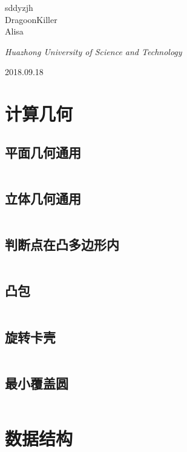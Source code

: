 \documentclass[UTF8]{ctexart}
\begin{document}
\begin{titlepage}
	{\protect sddyzjh \\ DragoonKiller \\ Alisa \\} %
	
	\vspace{0.5\baselineskip} %
	
	\textit{Huazhong University of Science and Technology} %
	
	\vfill %
	
	
\date{\today}
	2018.09.18 %
	

\end{titlepage}
\setcounter{secnumdepth}{0}
\tableofcontents
\newpage
\section{计算几何}
\subsection{平面几何通用}
\inputminted{cpp}{calculategeometry/平面几何通用.cpp}
\subsection{立体几何通用}
\inputminted{cpp}{calculategeometry/立体几何通用.cpp}
\subsection{判断点在凸多边形内}
\inputminted{cpp}{calculategeometry/判断点在凸多边形内.cpp}
\subsection{凸包}
\inputminted{cpp}{calculategeometry/凸包.cpp}
\subsection{旋转卡壳}
\inputminted{cpp}{calculategeometry/旋转卡壳.cpp}
\subsection{最小覆盖圆}
\inputminted{cpp}{calculategeometry/最小覆盖圆.cpp}
\section{数据结构}
\end{document}
